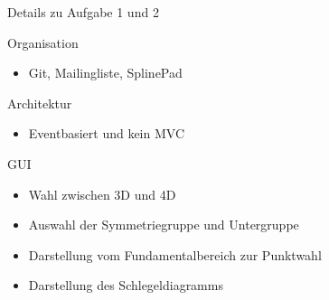 \documentclass[ucs,11pt]{beamer}
\begin{document}
\begin{frame}{Details zu Aufgabe 1 und 2}
\end{frame}

\begin{frame}{Organisation}
  	\begin{itemize}
   	 \item Git, Mailingliste, SplinePad
  	\end{itemize}
\end{frame}

\begin{frame}{Architektur}
	\begin{itemize}
	\item Eventbasiert und kein MVC
	\end{itemize}
\end{frame}

\begin{frame}{GUI}
	\begin{itemize}
	\item Wahl zwischen 3D und 4D
	\item Auswahl der Symmetriegruppe und Untergruppe
	\item Darstellung vom Fundamentalbereich zur Punktwahl
	\item Darstellung des Schlegeldiagramms
	\end{itemize}
\end{frame}
\end{document}
